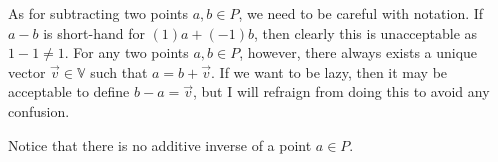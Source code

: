 \documentclass[12pt]{article}
\newcommand{\V}{\mathbb{V}}
\begin{document}
As for subtracting two points $a,b\in P$, we need to be careful with notation.
If $a-b$ is short-hand for $(1)a+(-1)b$, then clearly this is unacceptable as $1-1\neq 1$.
For any two points $a,b\in P$, however, there always exists a unique vector $\vec{v}\in\V$
such that $a=b+\vec{v}$.  If we want to be lazy, then it may be acceptable to define
$b-a=\vec{v}$, but I will refraign from doing this to avoid any confusion.

Notice that there is no additive inverse of a point $a\in P$.
\end{document}
